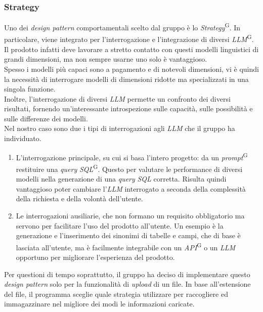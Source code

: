 \documentclass[5pt]{article}
\begin{document}
		\subsubsection{Strategy}
			Uno dei \textit{design pattern} comportamentali scelto dal gruppo è lo \textit{Strategy}\textsuperscript{G}. 
			In particolare, viene integrato per l'interrogazione e l'integrazione di diversi \textit{LLM}\textsuperscript{G}. 
			Il prodotto infatti deve lavorare a stretto contatto con questi modelli linguistici di grandi dimensioni, ma non sempre usarne uno solo è vantaggioso.  \\
			
			Spesso i modelli più capaci sono a pagamento e di notevoli dimensioni, vi è quindi la necessità di interrogare modelli di dimensioni ridotte ma specializzati in una singola funzione. \\
			
			Inoltre, l'interrogazione di diversi \textit{LLM} permette un confronto dei diversi risultati, fornendo un'interessante introspezione sulle capacità, sulle possibilità e sulle differenze dei modelli. \\
			
			Nel nostro caso sono due i tipi di interrogazioni agli \textit{LLM} che il gruppo ha individuato.
			\begin{enumerate}
				\item L'interrogazione principale, su cui si basa l'intero progetto: da un \textit{prompt}\textsuperscript{G} restituire una \textit{query} \textit{SQL}\textsuperscript{G}. 
				Questo per valutare le performance di diversi modelli nella generazione di una \textit{query} \textit{SQL} corretta. 
				Risulta quindi vantaggioso poter cambiare l'\textit{LLM} interrogato a seconda della complessità della richiesta e della volontà dell'utente. 
				
				\item Le interrogazioni ausiliarie, che non formano un requisito obbligatorio ma servono per facilitare l'uso del prodotto all'utente. 
					Un esempio è la generazione e l'inserimento dei sinonimi di tabelle e campi, che di base è lasciata all'utente, 
					ma è facilmente integrabile con un \textit{API}\textsuperscript{G} o un \textit{LLM} opportuno per migliorare l'esperienza del prodotto.
			\end{enumerate}
			Per questioni di tempo soprattutto, il gruppo ha deciso di implementare questo \textit{design pattern} solo per la funzionalità di \textit{upload} di un file. In base all'estensione del file, il programma sceglie quale strategia utilizzare per raccogliere ed immagazzinare nel migliore dei modi le informazioni caricate.
	
\end{document}

